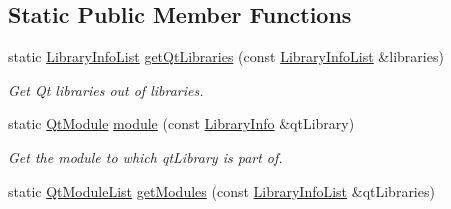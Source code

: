 \subsection*{Static Public Member Functions}
\begin{DoxyCompactItemize}
\item 
static \hyperlink{class_mdt_1_1_deploy_utils_1_1_library_info_list}{Library\+Info\+List} \hyperlink{class_mdt_1_1_deploy_utils_1_1_qt_library_a0c576f08e6aa61164cd9d5c8faad475c}{get\+Qt\+Libraries} (const \hyperlink{class_mdt_1_1_deploy_utils_1_1_library_info_list}{Library\+Info\+List} \&libraries)\hypertarget{class_mdt_1_1_deploy_utils_1_1_qt_library_a0c576f08e6aa61164cd9d5c8faad475c}{}\label{class_mdt_1_1_deploy_utils_1_1_qt_library_a0c576f08e6aa61164cd9d5c8faad475c}

\begin{DoxyCompactList}\small\item\em Get Qt libraries out of {\itshape libraries}. \end{DoxyCompactList}\item 
static \hyperlink{namespace_mdt_1_1_deploy_utils_af64a196dd2a56ed4930253e7fb4ed591}{Qt\+Module} \hyperlink{class_mdt_1_1_deploy_utils_1_1_qt_library_aa54f542e548bcab6da5e8a9696169a94}{module} (const \hyperlink{class_mdt_1_1_deploy_utils_1_1_library_info}{Library\+Info} \&qt\+Library)\hypertarget{class_mdt_1_1_deploy_utils_1_1_qt_library_aa54f542e548bcab6da5e8a9696169a94}{}\label{class_mdt_1_1_deploy_utils_1_1_qt_library_aa54f542e548bcab6da5e8a9696169a94}

\begin{DoxyCompactList}\small\item\em Get the module to which {\itshape qt\+Library} is part of. \end{DoxyCompactList}\item 
static \hyperlink{class_mdt_1_1_deploy_utils_1_1_qt_module_list}{Qt\+Module\+List} \hyperlink{class_mdt_1_1_deploy_utils_1_1_qt_library_ac7fd0c6a555df4f4ca7361e36f1a4ae4}{get\+Modules} (const \hyperlink{class_mdt_1_1_deploy_utils_1_1_library_info_list}{Library\+Info\+List} \&qt\+Libraries)\hypertarget{class_mdt_1_1_deploy_utils_1_1_qt_library_ac7fd0c6a555df4f4ca7361e36f1a4ae4}{}\label{class_mdt_1_1_deploy_utils_1_1_qt_library_ac7fd0c6a555df4f4ca7361e36f1a4ae4}


\end{DoxyCompactItemize}
